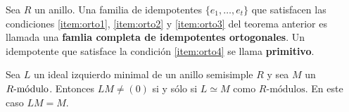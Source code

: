 \begin{definicion}
Sea $R$ un anillo. Una familia de idempotentes $\{ e_1, \dots, e_t \}$ que satisfacen las condiciones \ref{item:orto1}, \ref{item:orto2} y \ref{item:orto3} del teorema anterior es llamada una \textbf{famlia completa de idempotentes ortogonales}. Un idempotente que satisface la condición \ref{item:orto4} se llama \textbf{primitivo}.
\end{definicion}
\begin{lema}\label{lema:multiModulo}
Sea $L$ un ideal izquierdo minimal de un anillo semisimple $R$ y sea $M$ un $\modulo{R}$. Entonces $LM \neq (0)$ si y sólo si $L \simeq M$ como $R\mbox{-módulos}$. En este caso $LM = M$.
\end{lema}


